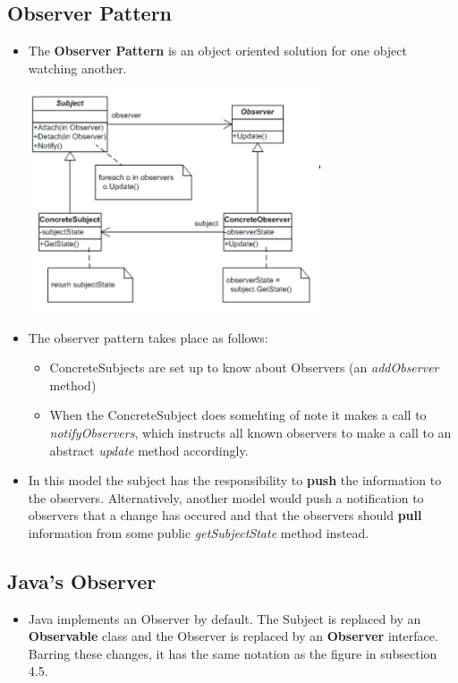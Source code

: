 \documentclass[letterpaper] {article}
\begin{document}
    \subsection{Observer Pattern}
    \begin{itemize}
        \item The \textbf{Observer Pattern} is an object oriented solution for one object watching another. 
            \begin{center}
                \includegraphics[width=3.4in]{observer}
            \end{center}
        \item The observer pattern takes place as follows:
            \begin{itemize}
                \item ConcreteSubjects are set up to know about Observers (an \textit{addObserver} method)
                \item When the ConcreteSubject does somehting of note it makes a call to \textit{notifyObservers}, which instructs all known observers to make a call to an abstract \textit{update} method accordingly. 
            \end{itemize}
        \item In this model the subject has the responsibility to \textbf{push} the information to the observers. Alternatively, another model would push a notification to observers that a change has occured and that the observers should \textbf{pull} information from some public \textit{getSubjectState} method instead. 
    \end{itemize}

    \subsection{Java's Observer}
    \begin{itemize}
        \item Java implements an Observer by default. The Subject is replaced by an \textbf{Observable} class and the Observer is replaced by an \textbf{Observer} interface. Barring these changes, it has the same notation as the figure in subsection 4.5. 
    \end{itemize}
\end{document}
